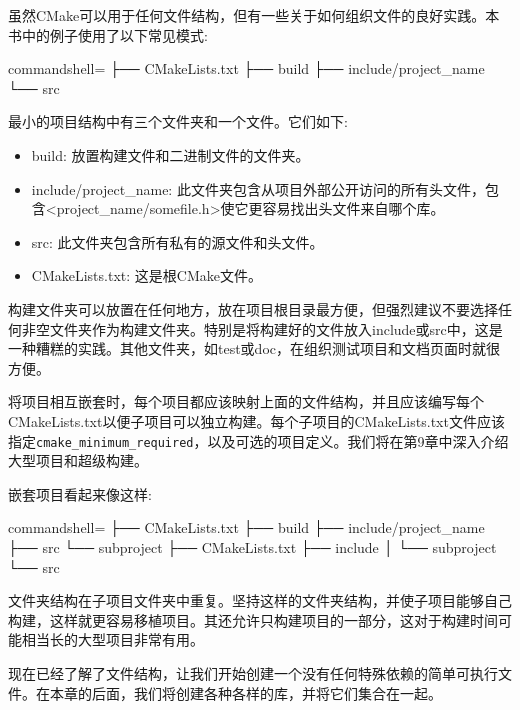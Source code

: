 虽然CMake可以用于任何文件结构，但有一些关于如何组织文件的良好实践。本书中的例子使用了以下常见模式:

\begin{tcblisting}{commandshell={}}
├── CMakeLists.txt
├── build
├── include/project_name
└── src
\end{tcblisting}

最小的项目结构中有三个文件夹和一个文件。它们如下:

\begin{itemize}
\item 
build: 放置构建文件和二进制文件的文件夹。

\item 
include/project\_name: 此文件夹包含从项目外部公开访问的所有头文件，包含<project\_name/somefile.h>使它更容易找出头文件来自哪个库。

\item 
src: 此文件夹包含所有私有的源文件和头文件。

\item 
CMakeLists.txt: 这是根CMake文件。
\end{itemize}

构建文件夹可以放置在任何地方，放在项目根目录最方便，但强烈建议不要选择任何非空文件夹作为构建文件夹。特别是将构建好的文件放入include或src中，这是一种糟糕的实践。其他文件夹，如test或doc，在组织测试项目和文档页面时就很方便。


将项目相互嵌套时，每个项目都应该映射上面的文件结构，并且应该编写每个CMakeLists.txt以便子项目可以独立构建。每个子项目的CMakeLists.txt文件应该指定\texttt{cmake\_minimum\_required}，以及可选的项目定义。我们将在第9章中深入介绍大型项目和超级构建。

嵌套项目看起来像这样:

\begin{tcblisting}{commandshell={}}
├── CMakeLists.txt
├── build
├── include/project_name
├── src
└── subproject
        ├── CMakeLists.txt
        ├── include
        │       └── subproject
        └── src
\end{tcblisting}

文件夹结构在子项目文件夹中重复。坚持这样的文件夹结构，并使子项目能够自己构建，这样就更容易移植项目。其还允许只构建项目的一部分，这对于构建时间可能相当长的大型项目非常有用。

现在已经了解了文件结构，让我们开始创建一个没有任何特殊依赖的简单可执行文件。在本章的后面，我们将创建各种各样的库，并将它们集合在一起。


















